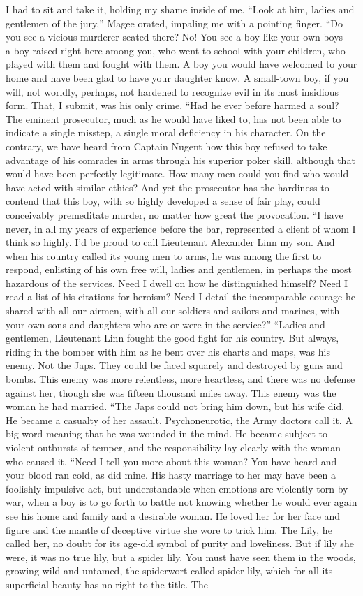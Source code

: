\documentclass{novel}
\begin{document}
I had to sit and take it, holding my shame inside of me. “Look at him, ladies and gentlemen of the jury,” Magee orated, impaling me with a pointing finger. “Do you see a vicious murderer seated there? No! You see a boy like your own boys—a boy raised right here among you, who went to school with your children, who played with them and fought with them. A boy you would have welcomed to your home and have been glad to have your daughter know. A small-town boy, if you will, not worldly, perhaps, not hardened to recognize evil in its most insidious form. That, I submit, was his only crime. “Had he ever before harmed a soul? The eminent prosecutor, much as he would have liked to, has not been able to indicate a single misstep, a single moral deficiency in his character. On the contrary, we have heard from Captain Nugent how this boy refused to take advantage of his comrades in arms through his superior poker skill, although that would have been perfectly legitimate. How many men could you find who would have acted with similar ethics? And yet the prosecutor has the hardiness to contend that this boy, with so highly developed a sense of fair play, could conceivably premeditate murder, no matter how great the provocation. “I have never, in all my years of experience before the bar, represented a client of whom I think so highly. I’d be proud to call Lieutenant Alexander Linn my son. And when his country called its young men to arms, he was among the first to respond, enlisting of his own free will, ladies and gentlemen, in perhaps the most hazardous of the services. Need I dwell on how he distinguished himself? Need I read a list of his citations for heroism? Need I detail the incomparable courage he shared with all our airmen, with all our soldiers and sailors and marines, with your own sons and daughters who are or were in the service?” “Ladies and gentlemen, Lieutenant Linn fought the good fight for his country. But always, riding in the bomber with him as he bent over his charts and maps, was his enemy. Not the Japs. They could be faced squarely and destroyed by guns and bombs. This enemy was more relentless, more heartless, and there was no defense against her, though she was fifteen thousand miles away. This enemy was the woman he had married. “The Japs could not bring him down, but his wife did. He became a casualty of her assault. Psychoneurotic, the Army doctors call it. A big word meaning that he was wounded in the mind. He became subject to violent outbursts of temper, and the responsibility lay clearly with the woman who caused it. “Need I tell you more about this woman? You have heard and your blood ran cold, as did mine. His hasty marriage to her may have been a foolishly impulsive act, but understandable when emotions are violently torn by war, when a boy is to go forth to battle not knowing whether he would ever again see his home and family and a desirable woman. He loved her for her face and figure and the mantle of deceptive virtue she wore to trick him. The Lily, he called her, no doubt for its age-old symbol of purity and loveliness. But if lily she were, it was no true lily, but a spider lily. You must have seen them in the woods, growing wild and untamed, the spiderwort called spider lily, which for all its superficial beauty has no right to the title. The 
\end{document}
